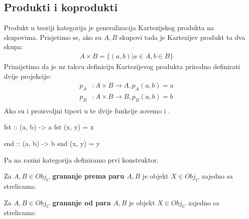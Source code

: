   \subsection{Produkti i koprodukti}
  Produkt u teoriji kategorija je generalizacija Kartezijskog produkta na
  skupovima. Prisjetimo se, ako su $A, B$ skupovi tada je Kartezijev produkt ta
  dva skupa:
  \begin{align*}
    A \times B = \{ (a, b) | a \in A, b \in B\}
  \end{align*}
  Primijetimo da je uz takvu definiciju Kartezijevog produkta prirodno
  definirati dvije projekcije:
  \begin{align*}
    p_A &: A \times B \to A, p_A(a, b) = a\\
    p_B &: A \times B \to B, p_B(a, b) = b\\
  \end{align*}
  Ako su  i  proizvoljni tipovi u  te dvije
  funkcije zovemo  i .
  \begin{mcode}
    fst :: (a, b) -> a
    fst (x, y) = x

    snd :: (a, b) -> b
    snd (x, y) = y
  \end{mcode}
  Pa na razini kategorija definiramo prvi konstruktor.
  \begin{definition}
    Za $A, B \in Obj_C$ \textbf{grananje prema paru $A, B$} je objekt $X \in
    Obj_C$
    zajedno sa strelicama:
  \begin{center}
  \end{center}
  \end{definition}
  \begin{definition}
    Za $A, B \in Obj_C$ \textbf{grananje od para $A, B$} je objekt $X \in
    Obj_C$
    zajedno sa strelicama:
  \begin{center}
  \end{center}
  \end{definition}
